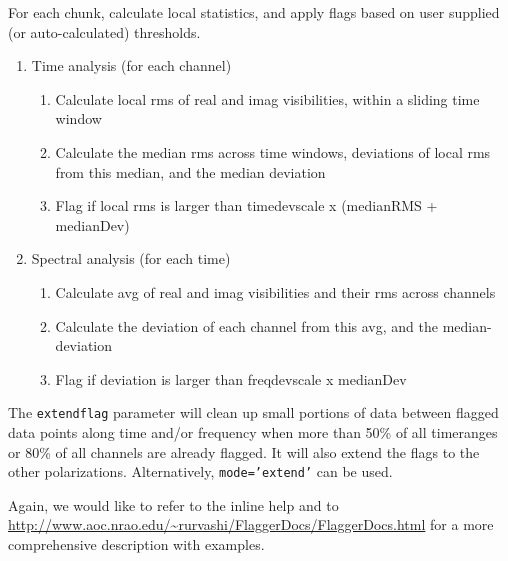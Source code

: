 For each chunk, calculate local statistics, and apply flags based on
user supplied (or auto-calculated) thresholds.

\begin{enumerate}
\item Time analysis (for each channel)
  \begin{enumerate}
      \item Calculate local rms of real and imag visibilities, within a sliding time window
      \item Calculate the median rms across time windows, deviations of local rms from this median, and the median deviation
      \item Flag if local rms is larger than timedevscale x (medianRMS + medianDev)
   \end{enumerate}
\item Spectral analysis (for each time)
   \begin{enumerate}
       \item Calculate avg of real and imag visibilities and their rms across channels
       \item Calculate the deviation of each channel from this avg, and the median-deviation
       \item Flag if deviation is larger than freqdevscale x medianDev
   \end{enumerate}
\end{enumerate}

%
%                     

The {\tt extendflag} parameter will clean up small portions of data
between flagged data points along time and/or frequency when more than
50\% of all timeranges or 80\% of all channels are already flagged. It
will also extend the flags to the other polarizations. Alternatively,
{\tt mode='extend'} can be used.

Again, we would like to refer to the inline help and to
\url{http://www.aoc.nrao.edu/~rurvashi/FlaggerDocs/FlaggerDocs.html}
for a more comprehensive description with examples.


